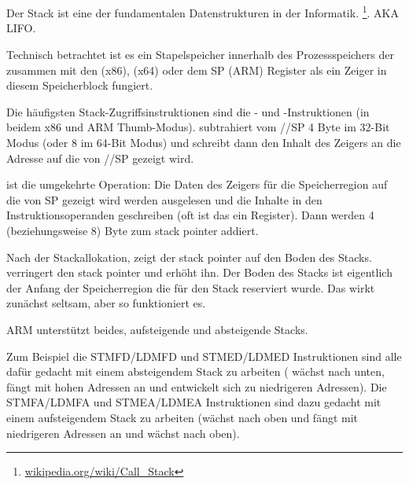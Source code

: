 \section{\Stack}
\label{sec:stack}
\myindex{\Stack}

Der Stack ist eine der fundamentalen Datenstrukturen in der Informatik.
\footnote{\href{http://go.yurichev.com/17119}{wikipedia.org/wiki/Call\_Stack}}.
\ac{AKA} \ac{LIFO}.

Technisch betrachtet ist es ein Stapelspeicher innerhalb des Prozessspeichers der zusammen mit den \ESP (x86), \RSP (x64) oder dem \ac{SP} (ARM) Register als ein Zeiger in diesem Speicherblock fungiert.


Die häufigsten Stack-Zugriffsinstruktionen sind die \PUSH- und \POP-Instruktionen (in beidem x86 und ARM Thumb-Modus). \PUSH subtrahiert vom \ESP/\RSP/\ac{SP} 4 Byte im 32-Bit Modus (oder 8 im 64-Bit Modus) und schreibt dann den Inhalt des Zeigers an die Adresse auf die von \ESP/\RSP/\ac{SP} gezeigt wird.

\POP ist die umgekehrte Operation: Die Daten des Zeigers für die Speicherregion auf die von \ac{SP}
gezeigt wird werden ausgelesen und die Inhalte in den Instruktionsoperanden geschreiben (oft ist das ein Register). Dann werden 4 (beziehungsweise 8) Byte zum \gls{stack pointer} addiert.

Nach der Stackallokation, zeigt der \gls{stack pointer} auf den Boden des Stacks.
\PUSH verringert den \gls{stack pointer} und \POP erhöht ihn.
Der Boden des Stacks ist eigentlich der Anfang der Speicherregion die für den Stack reserviert wurde.
Das wirkt zunächst seltsam, aber so funktioniert es.

ARM unterstützt beides, aufsteigende und absteigende Stacks.


Zum Beispiel die \ac{STMFD}/\ac{LDMFD} und \ac{STMED}/\ac{LDMED} Instruktionen sind alle dafür gedacht mit einem absteigendem Stack zu arbeiten ( wächst nach unten, fängt mit hohen Adressen an und entwickelt sich zu niedrigeren Adressen). Die \ac{STMFA}/\ac{LDMFA} und \ac{STMEA}/\ac{LDMEA} Instruktionen sind dazu gedacht mit einem aufsteigendem Stack zu arbeiten (wächst nach oben und fängt mit niedrigeren Adressen an und wächst nach oben).

